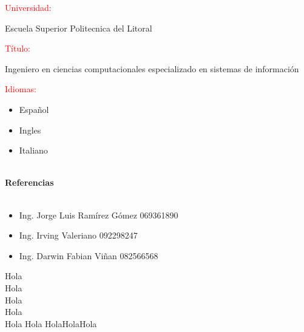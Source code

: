 \documentclass[20pt]{article}
\begin{document}
\begin{large}
\textcolor{red}{Universidad:}
\end{large}
Escuela Superior Politecnica del Litoral\\

\begin{large}
\textcolor{red}{Título:}
\end{large}
Ingeniero en ciencias computacionales especializado en sistemas de información\\

\begin{large}
\textcolor{red}{Idiomas:}
\end{large}
\begin{itemize}
\item Español
\item Ingles
\item Italiano\\\\
\end{itemize}

\begin{center}
\begin{huge}
\textbf{Referencias}\\\
\end{huge}
\end{center}

\begin{itemize}
\item Ing. Jorge Luis Ramírez Gómez 		069361890
\item Ing. Irving Valeriano			092298247
\item Ing. Darwin Fabian Viñan 		082566568
\end{itemize}


\begin{tabbing}
Hola\\
\> Hola\\
\>\> Hola\\
\>\>\>Hola\\
Hola \> Hola \>Hola\>Hola\>Hola\\
\end{tabbing}
\end{document}

